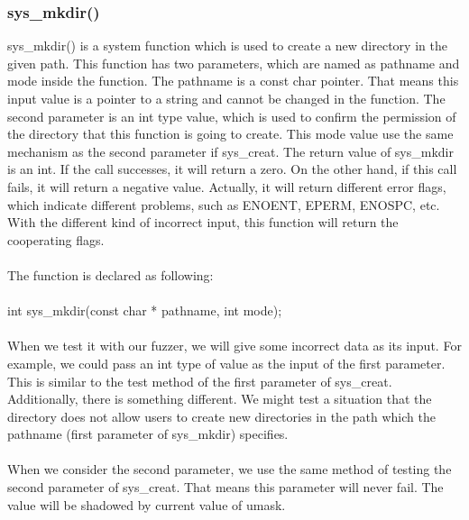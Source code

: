\documentclass[twoside]{article}
\begin{document}
\begin{multicols}{2}
\subsubsection{sys\_mkdir()}
sys\_mkdir() is a system function which is used to create a new directory in the given path. This function has two parameters, which are named as pathname and mode inside the function. The pathname is a const char pointer. That means this input value is a pointer to a string and cannot be changed in the function. The second parameter is an int type value, which is used to confirm the permission of the directory that this function is going to create. This mode value use the same mechanism as the second parameter if sys\_creat. The return value of sys\_mkdir is an int. If the call successes, it will return a zero. On the other hand, if this call fails, it will return a negative value. Actually, it will return different error flags, which indicate different problems, such as ENOENT, EPERM, ENOSPC, etc. With the different kind of incorrect input, this function will return the cooperating flags.\\\\
The function is declared as following:\\\\
int sys\_mkdir(const char * pathname, int mode);\\\\
When we test it with our fuzzer, we will give some incorrect data as its input. For example, we could pass an int type of value as the input of the first parameter. This is similar to the test method of the first parameter of sys\_creat. Additionally, there is something different. We might test a situation that the directory does not allow users to create new directories in the path which the pathname (first parameter of sys\_mkdir) specifies.\\\\
When we consider the second parameter, we use the same method of testing the second parameter of sys\_creat. That means this parameter will never fail. The value will be shadowed by current value of umask.

\end{multicols}
\end{document}
